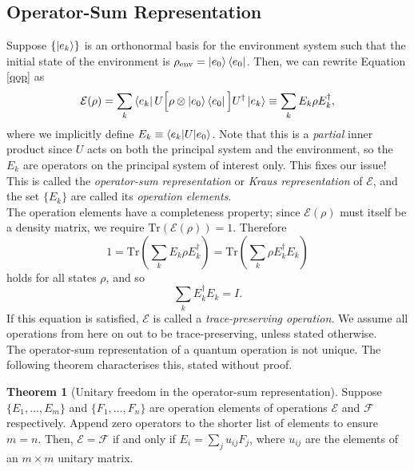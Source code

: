 \documentclass[12pt,a4paper]{report}
\numberwithin{equation}{section}
\newcommand{\ketbra}[2]{\ket{#1}\bra{#2}}
\newcommand{\ketbras}[1]{\ketbra{#1}{#1}}
\theoremstyle{definition}
\theoremstyle{theorem}
\newtheorem{theorem}{Theorem}[section]
\theoremstyle{theorem}
\theoremstyle{example}
\theoremstyle{definition}
\begin{document}
\subsection{Operator-Sum Representation}
Suppose $\{\ket{e_{k}}\}$ is an orthonormal basis for the environment system such that the initial state of the environment is $\rho_{\text{env}}=\ketbras{e_{0}}$. Then, we can rewrite Equation \ref{qop} as
\begin{equation}\label{opel}
	\mathcal{E}(\rho)=\sum_{k}\bra{e_{k}}U\Big[\rho\otimes\ketbras{e_{0}}\Big]U^{\dagger}\ket{e_{k}}\equiv\sum_{k}E_{k}\rho E_{k}^{\dagger},
\end{equation}
where we implicitly define $E_{k}\equiv\braket{e_{k}|U|e_{0}}$. Note that this is a \textit{partial} inner product since $U$ acts on both the principal system and the environment, so the $E_{k}$ are operators on the principal system of interest only. This fixes our issue! This is called the \textit{operator-sum representation} or \textit{Kraus representation} of $\mathcal{E}$, and the set $\{E_{k}\}$ are called its \textit{operation elements}.\\
The operation elements have a completeness property; since $\mathcal{E}(\rho)$ must itself be a density matrix, we require $\text{Tr}(\mathcal{E}(\rho))=1$. Therefore
\begin{equation}
	1=\text{Tr}\left(\sum_{k}E_{k}\rho E_{k}^{\dagger}\right)=\text{Tr}\left(\sum_{k}\rho E_{k}^{\dagger}E_{k}\right)
\end{equation}
holds for all states $\rho$, and so
\begin{equation}
	\sum_{k}E_{k}^{\dagger}E_{k}=I.
\end{equation}
If this equation is satisfied, $\mathcal{E}$ is called a \textit{trace-preserving operation}. We assume all operations from here on out to be trace-preserving, unless stated otherwise.\\
The operator-sum representation of a quantum operation is not unique. The following theorem characterises this, stated without proof.
\begin{theorem}[Unitary freedom in the operator-sum representation]
	Suppose $\{E_{1},\ldots,E_{m}\}$ and $\{F_{1},\ldots,F_{n}\}$ are operation elements of operations $\mathcal{E}$ and $\mathcal{F}$ respectively. Append zero operators to the shorter list of elements to ensure $m=n$. Then, $\mathcal{E}=\mathcal{F}$ if and only if $E_{i}=\sum_{j}u_{ij}F_{j}$, where $u_{ij}$ are the elements of an $m\times m$ unitary matrix.
\end{theorem}
\end{document}
